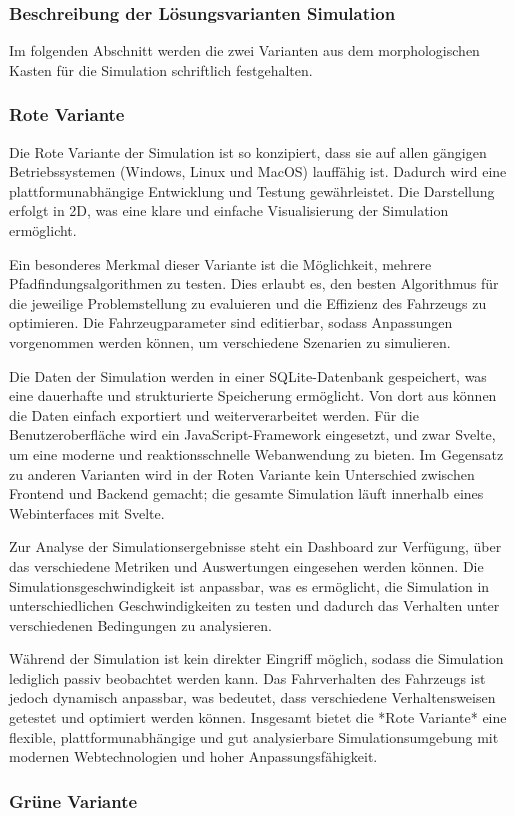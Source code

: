 \documentclass[main.tex]{subfiles} %
\begin{document}

\subsubsection{Beschreibung der Lösungsvarianten Simulation}
Im folgenden Abschnitt werden die zwei Varianten aus dem morphologischen Kasten für die Simulation
schriftlich festgehalten.

\subsubsection*{Rote Variante}
Die Rote Variante der Simulation ist so konzipiert, dass sie auf allen gängigen Betriebssystemen (Windows, Linux und MacOS) lauffähig ist. Dadurch wird eine plattformunabhängige Entwicklung und Testung gewährleistet. Die Darstellung erfolgt in 2D, was eine klare und einfache Visualisierung der Simulation ermöglicht.

Ein besonderes Merkmal dieser Variante ist die Möglichkeit, mehrere Pfadfindungsalgorithmen zu testen. Dies erlaubt es, den besten Algorithmus für die jeweilige Problemstellung zu evaluieren und die Effizienz des Fahrzeugs zu optimieren. Die Fahrzeugparameter sind editierbar, sodass Anpassungen vorgenommen werden können, um verschiedene Szenarien zu simulieren.

Die Daten der Simulation werden in einer SQLite-Datenbank gespeichert, was eine dauerhafte und strukturierte Speicherung ermöglicht. Von dort aus können die Daten einfach exportiert und weiterverarbeitet werden. Für die Benutzeroberfläche wird ein JavaScript-Framework eingesetzt, und zwar Svelte, um eine moderne und reaktionsschnelle Webanwendung zu bieten. Im Gegensatz zu anderen Varianten wird in der Roten Variante kein Unterschied zwischen Frontend und Backend gemacht; die gesamte Simulation läuft innerhalb eines Webinterfaces mit Svelte.

Zur Analyse der Simulationsergebnisse steht ein Dashboard zur Verfügung, über das verschiedene Metriken und Auswertungen eingesehen werden können. Die Simulationsgeschwindigkeit ist anpassbar, was es ermöglicht, die Simulation in unterschiedlichen Geschwindigkeiten zu testen und dadurch das Verhalten unter verschiedenen Bedingungen zu analysieren.

Während der Simulation ist kein direkter Eingriff möglich, sodass die Simulation lediglich passiv beobachtet werden kann. Das Fahrverhalten des Fahrzeugs ist jedoch dynamisch anpassbar, was bedeutet, dass verschiedene Verhaltensweisen getestet und optimiert werden können. Insgesamt bietet die *Rote Variante* eine flexible, plattformunabhängige und gut analysierbare Simulationsumgebung mit modernen Webtechnologien und hoher Anpassungsfähigkeit.

\subsubsection*{Grüne Variante}
\lipsum[4]
\end{document}
